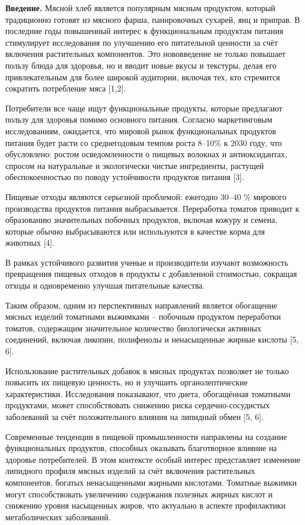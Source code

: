 \begin{multicols}{2}
{\bfseries Введение.} Мясной хлеб является популярным мясным продуктом,
который традиционно готовят из мясного фарша, панировочных сухарей, яиц
и приправ. В последние годы повышенный интерес к функциональным
продуктам питания стимулирует исследования по улучшению его питательной
ценности за счёт включения растительных компонентов. Это нововведение не
только повышает пользу блюда для здоровья, но и вводит новые вкусы и
текстуры, делая его привлекательным для более широкой аудитории, включая
тех, кто стремится сократить потребление мяса {[}1,2{]}.

Потребители все чаще ищут функциональные продукты, которые предлагают
пользу для здоровья помимо основного питания. Согласно маркетинговым
исследованиям, ожидается, что мировой рынок функциональных продуктов
питания будет расти со среднегодовым темпом роста 8--10\% к 2030 году,
что обусловлено: ростом осведомленности о пищевых волокнах и
антиоксидантах, спросом на натуральные и экологически чистые
ингредиенты, растущей обеспокоенностью по поводу устойчивости продуктов
питания {[}3{]}.

Пищевые отходы являются серьезной проблемой: ежегодно 30--40 \% мирового
производства продуктов питания выбрасывается. Переработка томатов
приводит к образованию значительных побочных продуктов, включая кожуру и
семена, которые обычно выбрасываются или используются в качестве корма
для животных {[}4{]}.

В рамках устойчивого развития ученые и производители изучают возможность
превращения пищевых отходов в продукты с добавленной стоимостью,
сокращая отходы и одновременно улучшая питательные качества.

Таким образом, одним из перспективных направлений является обогащение
мясных изделий томатными выжимками -- побочным продуктом переработки
томатов, содержащим значительное количество биологически активных
соединений, включая ликопин, полифенолы и ненасыщенные жирные кислоты
{[}5, 6{]}.

Использование растительных добавок в мясных продуктах позволяет не
только повысить их пищевую ценность, но и улучшить органолептические
характеристики. Исследования показывают, что диета, обогащённая
томатными продуктами, может способствовать снижению риска
сердечно-сосудистых заболеваний за счёт положительного влияния на
липидный обмен {[}5, 6{]}.

Современные тенденции в пищевой промышленности направлены на создание
функциональных продуктов, способных оказывать благотворное влияние на
здоровье потребителей. В этом контексте особый интерес представляет
изменение липидного профиля мясных изделий за счёт включения
растительных компонентов, богатых ненасыщенными жирными кислотами.
Томатные выжимки могут способствовать увеличению содержания полезных
жирных кислот и снижению уровня насыщенных жиров, что актуально в
аспекте профилактики метаболических заболеваний.
\end{multicols}

